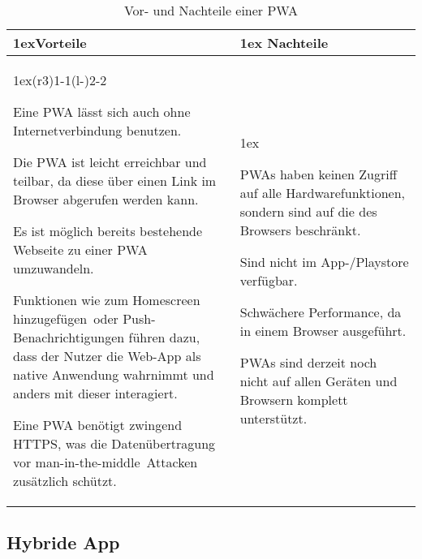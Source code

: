 \begin{table}[ht!]
	\begin{tabularx}{\linewidth}{>{\parskip1ex}X@{\kern4\tabcolsep}>{\parskip1ex}X}
		\toprule
		\hfil\bfseries Vorteile
		&
		\hfil\bfseries Nachteile
		\\\cmidrule(r{3\tabcolsep}){1-1}\cmidrule(l{-\tabcolsep}){2-2}
		
		Eine \ac{PWA} lässt sich auch ohne Internetverbindung benutzen.\par
		Die \ac{PWA} ist leicht erreichbar und teilbar, da diese über einen Link im Browser abgerufen werden kann.\par
		Es ist möglich bereits bestehende Webseite zu einer \ac{PWA} umzuwandeln.\par
		Funktionen wie \glqq zum Homescreen hinzugefügen\grqq\ oder Push-Benachrichtigungen führen dazu, dass der Nutzer die Web-App als native Anwendung wahrnimmt und anders mit dieser interagiert\cite{medium_pwa_pro_con}.\par
		Eine \ac{PWA} benötigt zwingend \ac{HTTPS}, was die Datenübertragung vor \glqq man-in-the-middle\grqq\ Attacken zusätzlich schützt.\par
		
		&
		
		\ac{PWA}s haben keinen Zugriff auf alle Hardwarefunktionen, sondern sind auf die des Browsers beschränkt.\par
		Sind nicht im App-/Playstore verfügbar.\par
		Schwächere Performance, da in einem Browser ausgeführt.\par
		\ac{PWA}s sind derzeit noch nicht auf allen Geräten und Browsern komplett unterstützt.\par
		\\\bottomrule
	\end{tabularx}
	\caption[Vor- und Nachteile einer \ac{PWA}]{Vor- und Nachteile einer \ac{PWA}\cite{adetunji_pwa}}
\end{table}

\clearpage
\subsection{Hybride App}

